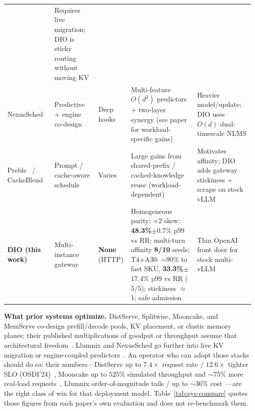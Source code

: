 \documentclass[pdflatex,sn-mathphys-num]{sn-jnl}
\begin{document}
\begin{table}[!t]
\begin{tabular}{@{}p{1.55cm}p{2.0cm}p{1.35cm}p{3.55cm}p{3.7cm}@{}}
  & Requires live migration; DIO is sticky routing without moving KV \\
NexusSched~\cite{nexussched}
  & Predictive + engine co-design
  & Deep hooks
  & Multi-feature $O(d^2)$ predictors + two-layer synergy (see paper for workload-specific gains)
  & Heavier model/update; DIO uses $O(d)$ dual-timescale NLMS \\
Preble~\cite{preble} / CacheBlend~\cite{cacheblend}
  & Prompt / cache-aware schedule
  & Varies
  & Large gains from shared-prefix / cached-knowledge reuse (workload-dependent)
  & Motivates affinity; DIO adds gateway stickiness + scrape on stock vLLM \\
\midrule
\textbf{DIO (this work)}
  & Multi-instance gateway
  & \textbf{None} (HTTP)
  & Homogeneous parity; $\times 2$ skew: \textbf{48.3\%}$\pm$0.7\% p99 vs RR; multi-turn affinity \textbf{8/10} seeds; T4$+$A30: $\sim$90\% to fast SKU, \textbf{33.3\%}$\pm$17.4\% p99 vs RR ($5/5$); stickiness $\approx$1; safe admission
  & Thin OpenAI front door for stock multi-vLLM \\
\bottomrule
\end{tabular}
\end{table}

\textbf{What prior systems optimize.}
DistServe, Splitwise, Mooncake, and MemServe co-design prefill/decode pools, KV
placement, or elastic memory planes; their published multiplications of goodput or
throughput assume that architectural freedom~\cite{distserve,splitwise,mooncake,memserve}.
Llumnix and NexusSched go further into live KV migration or engine-coupled
predictors~\cite{llumnix,nexussched}. An operator who can adopt those stacks should
do so:
their numbers---DistServe up to $7.4\times$ request rate / $12.6\times$ tighter SLO
(OSDI'24)~\cite{distserve}, Mooncake up to $525\%$ simulated throughput and
$\sim$75\% more real-load requests~\cite{mooncake}, Llumnix order-of-magnitude
tails / up to $\sim$36\% cost~\cite{llumnix}---are the right class of win for that
deployment model. Table~\ref{tab:sys-compare} quotes those figures from each paper's
own evaluation and does not re-benchmark them.
\end{document}

